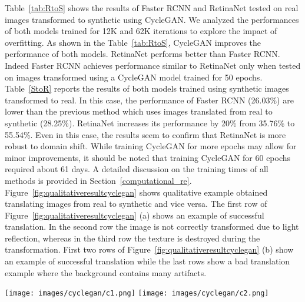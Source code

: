 \documentclass[preprint]{elsarticle}
\begin{document}
Table~\ref{tab:RtoS} shows the results of Faster RCNN and RetinaNet tested on real images transformed to synthetic using CycleGAN. We analyzed the performances of both models trained for 12K and 62K iterations to explore the impact of overfitting. As shown in the Table~\ref{tab:RtoS}, CycleGAN improves the performance of both models. RetinaNet performs better than Faster RCNN. Indeed Faster RCNN achieves performance similar to RetinaNet only when tested on images transformed using a CycleGAN model trained for 50 epochs. Table~\ref{StoR} reports the results of both models trained using synthetic images transformed to real. In this case, the performance of Faster RCNN (26.03\%) are lower than the previous method which uses images translated from real to synthetic (28.25\%). RetinaNet increases its performance by 20\% from 35.76\% to 55.54\%. Even in this case, the results seem to confirm that RetinaNet is more robust to domain shift. While training CycleGAN for more epochs may allow for minor improvements, it should be noted that training CycleGAN for 60 epochs required about 61 days.
A detailed discussion on the training times of all methods is provided in Section~\ref{computational_re}. Figure~\ref{fig:qualitativeresultcyclegan} shows qualitative example obtained translating images from real to synthetic and vice versa. The first row of Figure~\ref{fig:qualitativeresultcyclegan} (a) shows an example of successful translation. In the second row the image is not correctly transformed due to light reflection, whereas in the third row the texture is destroyed during the transformation. First two rows of Figure~\ref{fig:qualitativeresultcyclegan} (b) show an example of successful translation while the last rows show a bad translation example where the background contains many artifacts.
\begin{figure*}[t]
 \centering
    \texttt{[image: images/cyclegan/c1.png]}
    \quad
    \texttt{[image: images/cyclegan/c2.png]}
    \caption{Qualitative CycleGAN results. We show the source domain (real synthetic), the transformed image, and a reference image for visual comparison. Left: transformation from real to synthetic. Right: transformation from synthetic to real.}
    \label{fig:qualitativeresultcyclegan}
\end{figure*}
\end{document}
